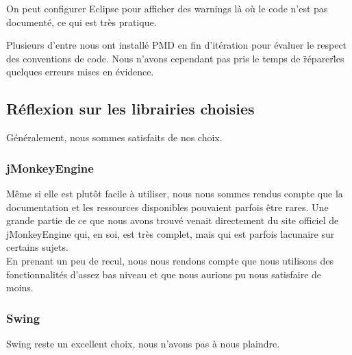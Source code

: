 	On peut configurer Eclipse pour afficher des warnings là où le code n'est
	pas documenté, ce qui est très pratique.

	Plusieurs d'entre nous ont installé PMD en fin d'itération pour évaluer le
	respect des conventions de code. Nous n'avons cependant pas pris le temps
	de \"réparer\" les quelques erreurs mises en évidence.

\subsection{Réflexion sur les librairies choisies}

	Généralement, nous sommes satisfaits de nos choix.

	\subsubsection{jMonkeyEngine}
	Même si elle est plutôt facile à utiliser, nous nous sommes rendus compte
	que la documentation et les ressources disponibles pouvaient parfois être
	rares. Une grande partie de ce que nous avons trouvé venait directement 
	du site officiel de jMonkeyEngine qui, en soi, est très complet, mais qui
	est parfois lacunaire sur certains sujets.\\

	En prenant un peu de recul, nous nous rendons compte que nous utilisons
	des fonctionnalités d'assez bas niveau et que nous aurions pu nous 
	satisfaire de moins.

	\subsubsection{Swing}
	Swing reste un excellent choix, nous n'avons pas à nous plaindre.

